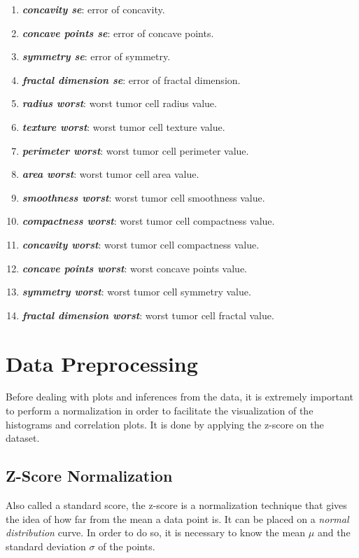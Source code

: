 \documentclass[conference]{IEEEtran}
\begin{document}
\begin{enumerate}
     \item \textbf{\textit{concavity se}}: error of concavity.
     \item \textbf{\textit{concave points se}}: error of concave points.
     \item \textbf{\textit{symmetry se}}: error of symmetry.
     \item \textbf{\textit{fractal dimension se}}: error of fractal dimension.
     
     \item \textbf{\textit{radius worst}}: worst tumor cell radius value.
     \item \textbf{\textit{texture worst}}: worst tumor cell texture value.
     \item \textbf{\textit{perimeter worst}}: worst tumor cell perimeter value.
     \item \textbf{\textit{area worst}}: worst tumor cell area value.
     \item \textbf{\textit{smoothness worst}}: worst tumor cell smoothness value. 
     \item \textbf{\textit{compactness worst}}: worst tumor cell compactness value.
     
     \item \textbf{\textit{concavity worst}}: worst tumor cell compactness value.
     \item \textbf{\textit{concave points worst}}: worst concave points value.
     \item \textbf{\textit{symmetry worst}}: worst tumor cell symmetry value.
     \item \textbf{\textit{fractal dimension worst}}: worst tumor cell fractal value.
     
\end{enumerate}

\section{Data Preprocessing}
Before dealing with plots and inferences from the data, it is extremely important to 
perform a normalization in order to facilitate the visualization of the histograms 
and correlation plots. It is done by applying the z-score on the dataset.

\subsection{Z-Score Normalization}

Also called a standard score, the z-score is a normalization technique that gives the 
idea of how far from the mean a data point is. It can be placed on a 
\textit{normal distribution} curve. In order to do so, it is necessary to know the 
mean $\mu$ and the standard deviation $\sigma$ of the points.
\end{document}
